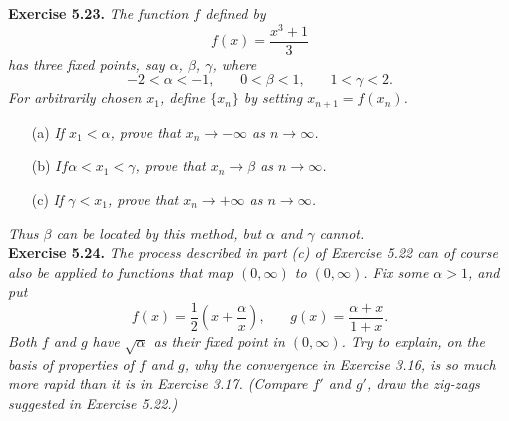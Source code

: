 \documentclass{article}
\begin{document}
\textbf{Exercise 5.23.}
\emph{The function $f$ defined by
\[
  f(x) = \frac{x^3 + 1}{3}
\]
has three fixed points, say $\alpha$, $\beta$, $\gamma$, where
\[
  −2 < \alpha < −1, \:\:\:\:\:\:\:\:
  0 < \beta < 1, \:\:\:\:\:\:\:\:
  1 < \gamma < 2.
\]
For arbitrarily chosen $x_1$, define $\{x_n\}$ by setting $x_{n+1} = f(x_n)$.}
\begin{enumerate}
  \item[(a)]
  \emph{If $x_1 < \alpha$, prove that $x_n \to -\infty$ as $n \to \infty$.}

  \item[(b)]
  \emph{$If \alpha < x_1 < \gamma$, prove that $x_n \to \beta$ as $n \to \infty$.}

  \item[(c)]
  \emph{If $\gamma < x_1$, prove that $x_n \to +\infty$ as $n \to \infty$.}
  \end{enumerate}
\emph{Thus $\beta$ can be located by this method,
but $\alpha$ and $\gamma$ cannot.} \\






\textbf{Exercise 5.24.}
\emph{The process described in part (c) of Exercise 5.22 can of course also be applied to
functions that map $(0,\infty)$ to $(0,\infty)$.
Fix some $\alpha > 1$, and put
\[
  f(x) = \frac{1}{2} \left( x + \frac{\alpha}{x} \right), \:\:\:\:\:\:\:\:
  g(x) = \frac{\alpha + x}{1 + x}.
\]
Both $f$ and $g$ have $\sqrt{\alpha}$ as their fixed point in $(0,\infty)$.
Try to explain, on the basis of properties of $f$ and $g$,
why the convergence in Exercise 3.16, is so much more rapid than it is in Exercise 3.17.
(Compare $f'$ and $g'$, draw the zig-zags suggested in Exercise 5.22.)} \\



\end{document}
